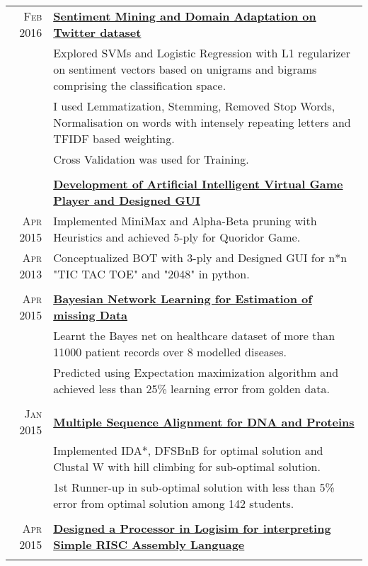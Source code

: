 \documentclass[a4paper,10pt]{article}
\begin{document}
\begin{longtable}{r|p{16cm}}
\textsc{Feb 2016} & \textbf{\href{https://github.com/kautsiitd/Sentiment-Mining}{Sentiment Mining and Domain Adaptation on Twitter dataset}} \\
& Explored SVMs and Logistic Regression with L1 regularizer on sentiment vectors based on unigrams and bigrams comprising the classification space.\\
& I used Lemmatization, Stemming, Removed Stop Words, Normalisation on words with intensely repeating letters and TFIDF based weighting.\\
& Cross Validation was used for Training.\\\multicolumn{2}{c}{}\\

& \textbf{\href{https://github.com/kautsiitd/Games-and-BOTS}{Development of Artificial Intelligent Virtual Game Player and Designed GUI}} \\
\textsc{Apr 2015} & Implemented MiniMax and Alpha-Beta pruning with Heuristics and achieved 5-ply for Quoridor Game.\\
\textsc{Apr 2013} & Conceptualized BOT with 3-ply and Designed GUI for n*n "TIC TAC TOE" and "2048" in python.\\\multicolumn{2}{c}{}\\

\textsc{Apr 2015} & \textbf{\href{https://github.com/kautsiitd/Data-Estimation-using-Bayesian-Network}{Bayesian Network Learning for Estimation of missing Data}} \\
& Learnt the Bayes net on healthcare dataset of more than 11000 patient records over 8 modelled diseases.\\
& Predicted using Expectation maximization algorithm and achieved less than 25\% learning error from golden data.\\\multicolumn{2}{c}{}\\

\textsc{Jan 2015} & \textbf{\href{https://github.com/kautsiitd/DNA-and-Proteins-Alignment}{Multiple Sequence Alignment for DNA and Proteins}} \\
& Implemented IDA*, DFSBnB for optimal solution and Clustal W with hill climbing for sub-optimal solution.\\
& 1st Runner-up in sub-optimal solution with less than 5\% error from optimal solution among 142 students.\\\multicolumn{2}{c}{}\\

\textsc{Apr 2015} & \textbf{\href{https://github.com/kautsiitd/Simple-RISC-Interpretor-in-Logisim}{Designed a Processor in Logisim for interpreting Simple RISC Assembly Language}} \\\multicolumn{2}{c}{}\\


\end{longtable}
\end{document}
